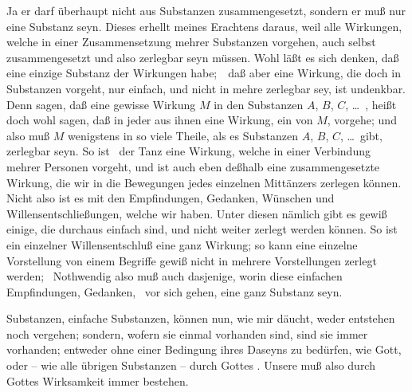\begin{aufza}
\item Ja er darf überhaupt nicht aus  Substanzen zusammengesetzt, sondern er muß nur eine  Substanz seyn. Dieses erhellt meines Erachtens daraus, weil alle Wirkungen, welche in einer Zusammensetzung mehrer Substanzen vorgehen, auch selbst zusammengesetzt und also zerlegbar seyn müssen. Wohl läßt es sich denken, daß eine einzige Substanz der Wirkungen  habe;~\ daß aber eine Wirkung, die doch in  Substanzen vorgeht, nur einfach, und nicht in mehre zerlegbar sey, ist undenkbar. Denn sagen, daß eine gewisse Wirkung $M$ in den Substanzen $A$, $B$, $C$, \ldots\ , heißt doch wohl sagen, daß in jeder aus ihnen eine  Wirkung, ein  von $M$, vorgehe; und also muß $M$ wenigstens in so viele Theile, als es Substanzen $A$, $B$, $C$, \ldots\ gibt, zerlegbar seyn. So ist \zB\ der Tanz eine Wirkung, welche in einer Verbindung mehrer Personen vorgeht, und ist auch eben deßhalb eine zusammengesetzte Wirkung, die wir in die Bewegungen jedes einzelnen Mittänzers zerlegen können. Nicht also ist es mit den Empfindungen, Gedanken, Wünschen und Willensentschließungen, welche wir haben. Unter diesen nämlich gibt es gewiß einige, die durchaus einfach sind, und nicht weiter zerlegt werden können. So ist ein einzelner Willensentschluß eine ganz  Wirkung; so kann eine einzelne Vorstellung von einem  Begriffe gewiß nicht in mehrere Vorstellungen zerlegt werden; \usw\ Nothwendig also muß auch dasjenige, worin diese einfachen Empfindungen, Gedanken, \usw\ vor sich gehen, eine ganz  Substanz seyn.
\item Substanzen, einfache Substanzen, können nun, wie mir däucht, weder entstehen noch vergehen; sondern, wofern sie einmal vorhanden sind, sind sie immer vorhanden; entweder ohne einer Bedingung ihres Daseyns zu bedürfen, wie Gott, oder -- wie alle übrigen Substanzen -- durch Gottes . Unsere  muß also durch Gottes Wirksamkeit immer bestehen.

\end{aufza}
